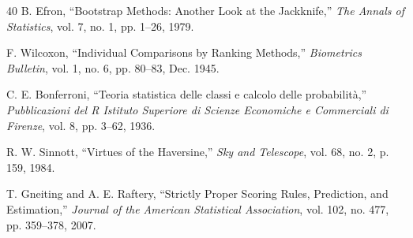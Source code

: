 \documentclass[10pt,twocolumn,a4paper]{article}
\begin{document}
\begin{thebibliography}{40}
B. Efron, ``Bootstrap Methods: Another Look at the Jackknife,'' \textit{The Annals of Statistics}, vol. 7, no. 1, pp. 1--26, 1979.

F. Wilcoxon, ``Individual Comparisons by Ranking Methods,'' \textit{Biometrics Bulletin}, vol. 1, no. 6, pp. 80--83, Dec. 1945.

C. E. Bonferroni, ``Teoria statistica delle classi e calcolo delle probabilit\`a,'' \textit{Pubblicazioni del R Istituto Superiore di Scienze Economiche e Commerciali di Firenze}, vol. 8, pp. 3--62, 1936.

R. W. Sinnott, ``Virtues of the Haversine,'' \textit{Sky and Telescope}, vol. 68, no. 2, p. 159, 1984.

T. Gneiting and A. E. Raftery, ``Strictly Proper Scoring Rules, Prediction, and Estimation,'' \textit{Journal of the American Statistical Association}, vol. 102, no. 477, pp. 359--378, 2007.

\end{thebibliography}
\end{document}
